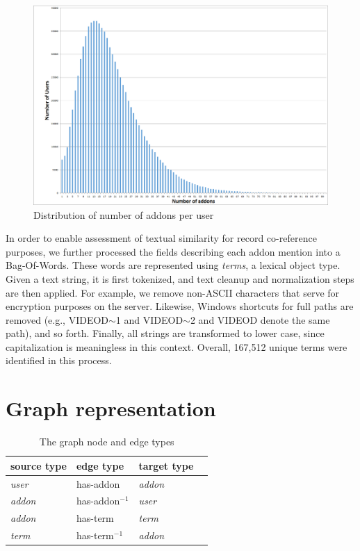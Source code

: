 \documentclass[11pt,oneside]{book}
\let\Oldsection\section
\renewcommand{\section}{\FloatBarrier\Oldsection}
\begin{document}
\begin{figure}[!htbp]
\centering
\includegraphics[width=\linewidth]{figures/user_addons_histogram.png}
\caption{Distribution of number of addons per user}
\label{fig:user_addons_histogram}
\end{figure}

In order to enable assessment of textual similarity for record co-reference purposes, we further processed the fields describing each addon mention into a Bag-Of-Words. These words are represented using {\it terms}, a lexical object type. Given a text string, it is first tokenized, and text cleanup and normalization steps are then applied. For example, we remove non-ASCII characters that serve for encryption purposes on the server. Likewise,  Windows shortcuts for full paths are removed (e.g., VIDEOD$\sim$1 and VIDEOD$\sim$2 and VIDEOD denote the same path), and so forth. Finally, all strings are transformed to lower case, since capitalization is meaningless in this context. Overall, 167,512 unique terms were identified in this process.


\section{Graph representation}
\label{tab:graph_representation}
\begin{table}[t]
\begin{center}
\begin{small}
\begin{tabular}{llll}
\hline 
\textbf{source type} & \textbf{edge type} & \textbf{target type} \\
\hline
{\it user} & has-addon & {\it addon} \\
\hline
{\it addon} &  has-addon$^{-1}$ & {\it user} \\
{\it addon} & has-term & {\it term} \\
\hline
{\it term} & has-term$^{-1}$ & {\it addon} \\
\hline
\end{tabular}
\end{small}
\end{center}
\caption{\label{tab:graph_structure} The graph node and edge types}
\end{table}
\end{document}
